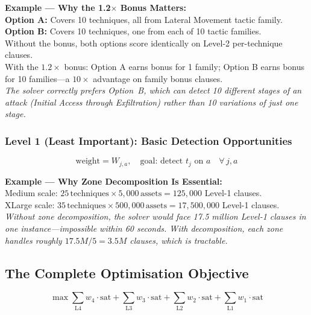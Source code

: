 \documentclass[journal]{IEEEtran}
\begin{document}
\begin{examplebox}
\textbf{Example --- Why the 1.2$\times$ Bonus Matters:}\\[3pt]
\textbf{Option A:} Covers 10 techniques, all from Lateral
Movement tactic family.\\
\textbf{Option B:} Covers 10 techniques, one from each of
10 tactic families.\\[3pt]
Without the bonus, both options score identically on
Level-2 per-technique clauses.\\
With the $1.2\times$ bonus: Option A earns bonus for
1 family; Option B earns bonus for 10 families---a
$10\times$ advantage on family bonus clauses.\\[3pt]
\textit{The solver correctly prefers Option~B, which can
detect 10 \emph{different stages} of an attack
(Initial Access through Exfiltration) rather than
10 variations of just one stage.}
\end{examplebox}

\subsubsection{Level 1 (Least Important): Basic Detection
              Opportunities}
\begin{equation}
  \text{weight} = W_{j,a},
  \quad \text{goal: detect } t_j \text{ on } a
  \quad \forall\, j, a
\end{equation}

\begin{examplebox}
\textbf{Example --- Why Zone Decomposition Is Essential:}\\[3pt]
Medium scale: $25\,\text{techniques} \times
5{,}000\,\text{assets} = 125{,}000$ Level-1 clauses.\\
XLarge scale: $35\,\text{techniques} \times
500{,}000\,\text{assets} = 17{,}500{,}000$ Level-1 clauses.\\[3pt]
\textit{Without zone decomposition, the solver would face
17.5 million Level-1 clauses in one instance---impossible
within 60 seconds.
With decomposition, each zone handles roughly
$17.5M/5 = 3.5M$ clauses, which is tractable.}
\end{examplebox}

\subsection{The Complete Optimisation Objective}

\begin{equation}
\max \sum_{\text{L4}} w_4 \cdot \mathrm{sat}
   + \sum_{\text{L3}} w_3 \cdot \mathrm{sat}
   + \sum_{\text{L2}} w_2 \cdot \mathrm{sat}
   + \sum_{\text{L1}} w_1 \cdot \mathrm{sat}
\end{equation}
\end{document}
